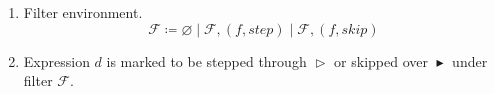 \documentclass{article}
\newcommand{\matches}{\mathrel{\mathop{\sim}}}
\newcommand{\steps}{\mathrel{\mathop{\vartriangleright}}}
\newcommand{\skips}{\mathrel{\mathop{\blacktriangleright}}}
\newcommand{\inl}{\operatorname{\mathsf{injL}}}
\newcommand{\inr}{\operatorname{\mathsf{injR}}}
\newcommand{\prl}{\operatorname{\mathsf{prjL}}}
\newcommand{\prr}{\operatorname{\mathsf{prjR}}}
\begin{document}
\begin{enumerate}
    \[
      \begin{prooftree}
        \hypo{f_1 \matches d_1}
        \infer1[(FM-Inj-L)]{
          \inl f_1 \matches \inl d_1
        }
      \end{prooftree}
      \quad
      \begin{prooftree}
        \hypo{f_1 \matches d_1}
        \infer1[(FM-Inj-R)]{
          \inr f_1 \matches \inr d_1
        }
      \end{prooftree}
    \]
    \[
      \begin{prooftree}
        \hypo{f_1 \matches d_1}
        \infer1[(FM-Prj-L)]{
          \prl f_1 \matches \inl d_1
        }
      \end{prooftree}
      \quad
      \begin{prooftree}
        \hypo{f_1 \matches d_1}
        \infer1[(FM-Prj-R)]{
          \prr f_1 \matches \inr d_1
        }
      \end{prooftree}
    \]
    \[
      \begin{prooftree}
        \hypo{f \matches d}
        \infer1[(FM-Fix-Exact)]{Y (\lambda x . f) \matches Y (\lambda x . d)}
      \end{prooftree}
      \quad
      \begin{prooftree}
        \hypo{f \matches d}
        \infer1[(FM-Fix-Wild)]{Y (\lambda \ast . f) \matches Y (\lambda x . d)}
      \end{prooftree}
    \]
    \[
      \begin{prooftree}
        \infer0[(FM-Num)]{\underline{n} \matches \underline{n}}
      \end{prooftree}
      \quad
      \begin{prooftree}
        \hypo{f_1 \matches d_1}
        \hypo{f_2 \matches d_2}
        \infer2[(FM-Add)]{f_1 + f_2 \matches d_1 + d_2}
      \end{prooftree}
      \quad
      \begin{prooftree}
        \hypo{f_1 \matches d_1}
        \hypo{f_2 \matches d_2}
        \infer2[(FM-Mul)]{f_1 \times f_2 \matches d_1 \times d_2}
      \end{prooftree}
    \]
  \item {} Filter environment.
    \[
      \mathcal{F} \coloneqq \varnothing \mid \mathcal{F}, (f, step) \mid
      \mathcal{F}, (f, skip)
    \]
  \item \fbox{\(\mathcal{F} \steps d, \mathcal{F} \skips d\)} Expression \(d\) is marked to be stepped
    through \(\steps\) or skipped over \(\skips\) under filter \(\mathcal{F}\).

\end{enumerate}
\end{document}
